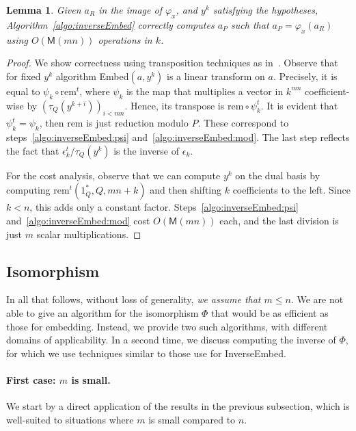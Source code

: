 \documentclass[12pt]{article}
\def\M {\ensuremath{\mathsf{M}}}
\def\rem {\ensuremath{\mathrm{rem}}}
\newtheorem{Lemma}{Lemma}
\begin{document}
\begin{Lemma}
  Given $a_R$ in the image of $\varphi_x$, and $y^k$ satisfying the
  hypotheses, Algorithm~\ref{algo:inverseEmbed} correctly computes
  $a_P$ such that $a_P=\varphi_x(a_R)$ using $O(\M(mn))$ operations in
  $k$.
\end{Lemma}
\begin{proof}
  We show correctness using transposition techniques as
  in~\cite{bostan+lecerf+schost:tellegen}. Observe that for fixed
  $y^k$ algorithm Embed$(a,y^k)$ is a linear transform on
  $a$. Precisely, it is equal to $\psi_k\circ\rem^t$, where $\psi_k$
  is the map that multiplies a vector in $k^{mn}$ coefficient-wise by
  $(\tau_Q(y^{k+i}))_{i<mn}$. Hence, its transpose is
  $\rem\circ\psi_k^t$. It is evident that $\psi_k^t=\psi_k$, then
  $\rem$ is just reduction modulo $P$. These correspond to
  steps~\ref{algo:inverseEmbed:psi}
  and~\ref{algo:inverseEmbed:mod}. The last step reflects the fact
  that $\epsilon_k^t/\tau_Q(y^k)$ is the inverse of $\epsilon_k$.

  For the cost analysis, observe that we can compute $y^k$ on the dual
  basis by computing $\rem^t(1_Q^\ast,Q,mn+k)$ and then shifting $k$
  coefficients to the left. Since $k<n$, this adds only a constant
  factor. Steps~\ref{algo:inverseEmbed:psi}
  and~\ref{algo:inverseEmbed:mod} cost $O(\M(mn))$ each, and the last
  division is just $m$ scalar multiplications.
\end{proof}



\subsection{Isomorphism} 

In all that follows, without loss of generality, {\em we assume that
  $m\le n$}. We are not able to give an algorithm for the isomorphism
$\Phi$ that would be as efficient as those for embedding. Instead, we
provide two such algorithms, with different domains of applicability.
In a second time, we discuss computing the inverse of $\Phi$,
for which we use techniques similar to those use for InverseEmbed.

\paragraph{First case: $m$ is small.}
We start by a direct application of the results in the previous
subsection, which is well-suited to situations where $m$ is small compared to $n$. 
\end{document}
